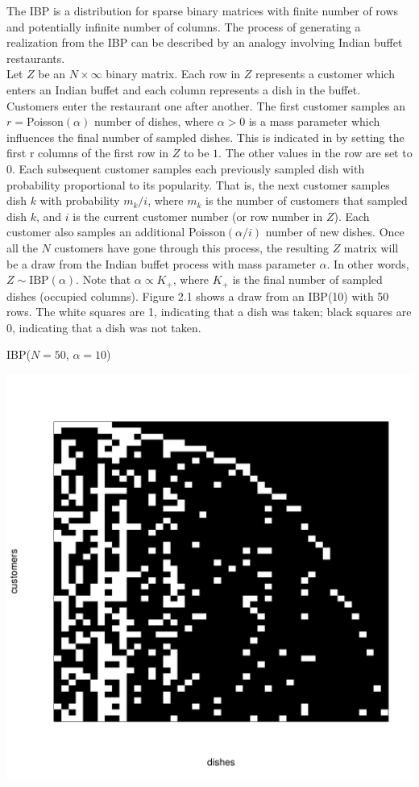 \noindent
The IBP is a distribution for sparse binary matrices with finite number of rows
and potentially infinite number of columns. The process of generating a
realization from the IBP can be described by an analogy involving Indian buffet
restaurants.\\

\noindent
Let $Z$ be an $N \times \infty$ binary matrix. Each row in $Z$ represents a
customer which enters an Indian buffet and each column represents a dish in the
buffet. Customers enter the restaurant one after another. The first customer
samples an $r=$Poisson$(\alpha)$ number of dishes, where $\alpha > 0$ is a mass
parameter which influences the final number of sampled dishes. This is
indicated in by setting the first r columns of the first row in $Z$ to be $1$.
The other values in the row are set to $0$. Each subsequent customer samples
each previously sampled dish with probability proportional to its popularity.
That is, the next customer samples dish $k$ with probability $m_k/i$,
where $m_k$ is the number of customers that sampled dish $k$, and $i$ is the
current customer number (or row number in $Z$). Each customer also samples an
additional Poisson$(\alpha/i)$ number of new dishes. Once all the $N$ customers
have gone through this process, the resulting $Z$ matrix will be a draw from
the Indian buffet process with mass parameter $\alpha$. In other words, $Z \sim
\text{IBP}(\alpha)$. Note that $\alpha \propto K_+$, where $K_+$ is the final
number of sampled dishes (occupied columns). Figure 2.1 shows a draw from an
IBP(10) with 50 rows. The white squares are 1, indicating that a dish was
taken; black squares are 0, indicating that a dish was not taken. \\
\beginmyfig
  \caption{IBP($N=50$, $\alpha=10$)}
  \includegraphics{images/ibp.pdf}
\endmyfig

